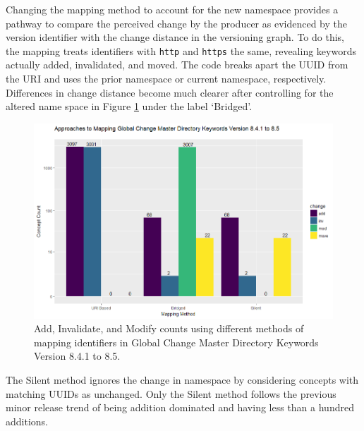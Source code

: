 Changing the mapping method to account for the new namespace provides a pathway to compare the perceived change by the producer as evidenced by the version identifier with the change distance in the versioning graph.
To do this, the mapping treats identifiers with \texttt{http} and \texttt{https} the same, revealing keywords actually added, invalidated, and moved.
The code breaks apart the UUID from the URI and uses the prior namespace or current namespace, respectively.
Differences in change distance become much clearer after controlling for the altered name space in Figure \ref{GCMDC2} under the label `Bridged'.
\begin{figure}%
	\centering
	\includegraphics[scale=.65]{GCMD8_5_R.png}
	\caption{Add, Invalidate, and Modify counts using different methods of mapping identifiers in Global Change Master Directory Keywords Version 8.4.1 to 8.5.}
	\label{GCMDC2}
\end{figure}
The Silent method ignores the change in namespace by considering concepts with matching UUIDs as unchanged.
Only the Silent method follows the previous minor release trend of being addition dominated and having less than a hundred additions.



